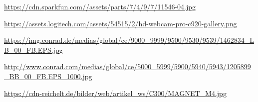 \cleardoublepage
{}
{}
\begin{thebibliography}{99}


\url{https://cdn.sparkfun.com//assets/parts/7/4/9/7/11546-04.jpg}

\url{https://assets.logitech.com/assets/54515/2/hd-webcam-pro-c920-gallery.png}

\url{https://img.conrad.de/medias/global/ce/9000_9999/9500/9530/9539/1462834_LB_00_FB.EPS.jpg}

\url{http://www.conrad.com/medias/global/ce/5000_5999/5900/5940/5943/1205899_BB_00_FB.EPS_1000.jpg}

\url{https://cdn-reichelt.de/bilder/web/artikel_ws/C300/MAGNET_M4.jpg}

\end{thebibliography}
